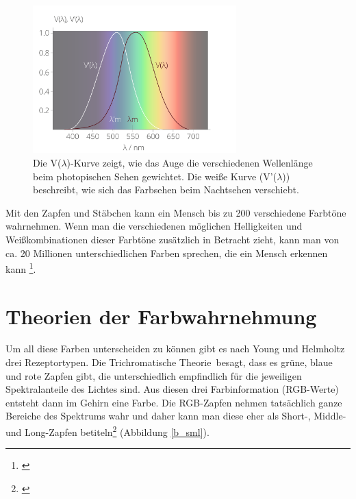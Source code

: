 \begin{figure}[H]     %
\centering
\includegraphics[width=0.7\textwidth]{bilder/augespek} 
\caption {Die V($\lambda$)-Kurve zeigt, wie das Auge die verschiedenen Wellenlänge beim photopischen Sehen gewichtet. Die weiße Kurve (V'($\lambda$)) beschreibt, wie sich das Farbsehen beim Nachtsehen verschiebt. \protect\footnotemark}\label{b_augespek}
\end{figure}


Mit den Zapfen und Stäbchen kann ein Mensch bis zu 200 verschiedene Farbtöne wahrnehmen. Wenn man die verschiedenen möglichen Helligkeiten und Weißkombinationen dieser Farbtöne zusätzlich in Betracht zieht, kann man von ca. 20 Millionen unterschiedlichen Farben sprechen, die ein Mensch erkennen kann \footnote{\cite{unimann}}.



\section{Theorien der Farbwahrnehmung}
 
Um all diese Farben unterscheiden zu können gibt es nach Young und Helmholtz drei Rezeptortypen. Die \glqq Trichromatische Theorie\grqq\ besagt, dass es grüne, blaue und rote Zapfen gibt, die unterschiedlich empfindlich für die jeweiligen Spektralanteile des Lichtes sind. Aus diesen drei Farbinformation (RGB-Werte) entsteht dann im Gehirn eine Farbe. Die RGB-Zapfen nehmen tatsächlich ganze Bereiche des Spektrums wahr und daher kann man diese eher als Short-, Middle- und Long-Zapfen betiteln\footnote{\cite[62-63]{greule}} (Abbildung \ref{b_sml}).

